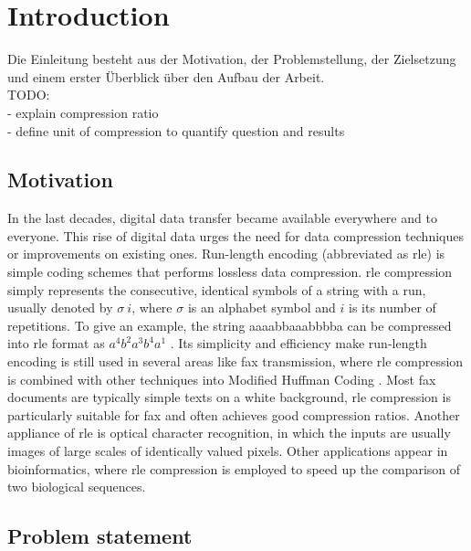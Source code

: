 
\chapter{Introduction}
\label{ch:Introduction}
Die Einleitung besteht aus der Motivation, der Problemstellung, der Zielsetzung und einem erster Überblick über den Aufbau der Arbeit. \\
TODO: \\
- explain compression ratio \\
- define unit of compression to quantify question and results \\

\section{Motivation}
\label{ch:Introduction:sec:Motivation}

In the last decades, digital data transfer became available everywhere and to everyone. This rise of digital data urges the need for data compression techniques or improvements on existing ones. Run-length encoding \cite{rle-patent} (abbreviated as rle) is simple coding schemes that performs lossless data compression. rle compression simply represents the consecutive, identical symbols of
a string with a run, usually denoted by $\sigma \ i$, where $\sigma$ is an alphabet symbol and $i$ is its number of repetitions. To give an example, the string aaaabbaaabbbba can be compressed into rle format as  $ a^{4}b^{2}a^{3}b^{4}a^{1}$ . Its simplicity and efficiency make run-length encoding is still used in several areas like fax transmission, where rle compression is combined with other techniques into Modified Huffman Coding \cite{fax-rle}. Most fax documents are typically simple texts on a white background, rle compression is particularly suitable for fax and often achieves good compression ratios. Another appliance of rle is optical character recognition, in which the inputs are usually images of large scales of identically valued pixels. Other applications appear in bioinformatics, where rle compression is employed to speed up the comparison of two biological sequences.

\section{Problem statement}
\label{ch:Introduction:sec:Problem statement}

